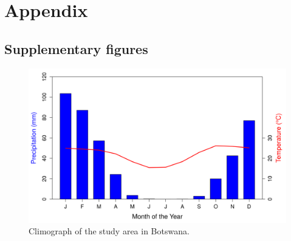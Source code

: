 \documentclass[12pt,a4paper, twoside, english]{article}
\newcommand{\beginsupplement}{%
        \setcounter{table}{0}
        \renewcommand{\thetable}{S\arabic{table}}%
        \setcounter{figure}{0}
        \renewcommand{\thefigure}{S\arabic{figure}}%
     }
\begin{document}
\newpage
{\singlespacing\footnotesize

}

\newpage
{}
\section*{Appendix}

\subsection*{Supplementary figures}

\beginsupplement


\begin{figure}[H]
  \centering
  \includegraphics[width=\textwidth]{figures/Climograph_BWA.png}
  \caption[Climograph of Ngamiland]{Climograph of the study area in Botswana.}
  \label{fig:climograph_bwa}
\end{figure}


\end{document}
